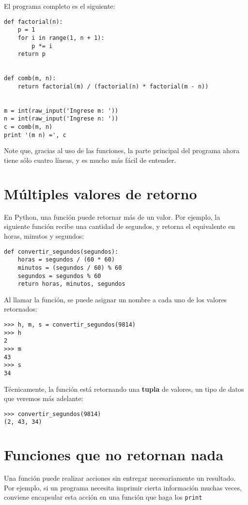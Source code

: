 El programa completo es el siguiente:
\begin{lstlisting}
def factorial(n):
    p = 1
    for i in range(1, n + 1):
        p *= i
    return p


def comb(m, n):
    return factorial(m) / (factorial(n) * factorial(m - n))


m = int(raw_input('Ingrese m: '))
n = int(raw_input('Ingrese n: '))
c = comb(m, n)
print '(m n) =', c
\end{lstlisting}



Note que, gracias al uso de las funciones, la parte principal del
programa ahora tiene sólo cuatro líneas, y es mucho más fácil de
entender.

\section{Múltiples valores de retorno}

En Python, una función puede retornar más de un valor.
Por ejemplo, la siguiente función recibe una cantidad de segundos, y
retorna el equivalente en horas, minutos y segundos:

\begin{lstlisting}
def convertir_segundos(segundos):
    horas = segundos / (60 * 60)
    minutos = (segundos / 60) % 60
    segundos = segundos % 60
    return horas, minutos, segundos
\end{lstlisting}

Al llamar la función, se puede asignar un nombre a cada uno de los
valores retornados:

\begin{lstlisting}
>>> h, m, s = convertir_segundos(9814)
>>> h
2
>>> m
43
>>> s
34
\end{lstlisting}

Técnicamente, la función está retornando una \textbf{tupla} de valores,
un tipo de datos que veremos más adelante:

\begin{lstlisting}
>>> convertir_segundos(9814)
(2, 43, 34)
\end{lstlisting}

\section{Funciones que no retornan nada}

Una función puede realizar acciones sin entregar necesariamente un
resultado.
Por ejemplo, si un programa necesita imprimir cierta información muchas
veces, conviene encapsular esta acción en una función que haga los
\lstinline!print!

